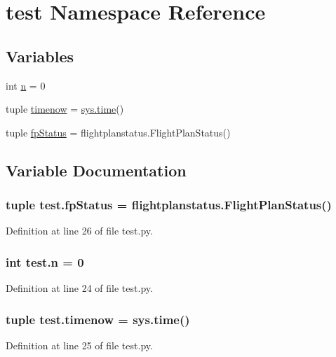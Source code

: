 \hypertarget{namespacetest}{\section{test Namespace Reference}
\label{namespacetest}
}
\subsection*{Variables}
\begin{DoxyCompactItemize}
\item 
int \hyperlink{namespacetest_ad7b3da39549c8b8519497f0346180d05}{n} = 0
\item 
tuple \hyperlink{namespacetest_ac030700ad9974c292dbeccf51cf743fd}{timenow} = \hyperlink{namespacesys_a8c7f9b5c713403b888d8346afb011cdb}{sys.\-time}()
\item 
tuple \hyperlink{namespacetest_a0943e10c21f0f854bf198d88a84f2895}{fp\-Status} = flightplanstatus.\-Flight\-Plan\-Status()
\end{DoxyCompactItemize}


\subsection{Variable Documentation}
\hypertarget{namespacetest_a0943e10c21f0f854bf198d88a84f2895}{
\subsubsection[{fp\-Status}]{\setlength{\rightskip}{0pt plus 5cm}tuple test.\-fp\-Status = flightplanstatus.\-Flight\-Plan\-Status()}}\label{namespacetest_a0943e10c21f0f854bf198d88a84f2895}


Definition at line 26 of file test.\-py.

\hypertarget{namespacetest_ad7b3da39549c8b8519497f0346180d05}{
\subsubsection[{n}]{\setlength{\rightskip}{0pt plus 5cm}int test.\-n = 0}}\label{namespacetest_ad7b3da39549c8b8519497f0346180d05}


Definition at line 24 of file test.\-py.

\hypertarget{namespacetest_ac030700ad9974c292dbeccf51cf743fd}{
\subsubsection[{timenow}]{\setlength{\rightskip}{0pt plus 5cm}tuple test.\-timenow = {\bf sys.\-time}()}}\label{namespacetest_ac030700ad9974c292dbeccf51cf743fd}


Definition at line 25 of file test.\-py.

